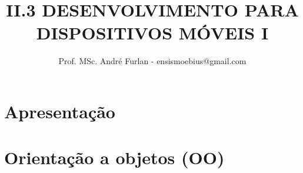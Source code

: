 

\title{II.3 DESENVOLVIMENTO PARA DISPOSITIVOS MÓVEIS I}


\author{Prof. MSc. André Furlan - ensismoebius@gmail.com}

\date{\the\year}

\newcommand{\apontar}[2]{
	\underset{\underset{#1}{\uparrow}}{\mathbf{#2}}
}


	
	\frame{\titlepage}
	
	\section{Apresentação}
		
		
	\section{Orientação a objetos (OO)}
		
%		
		
	
